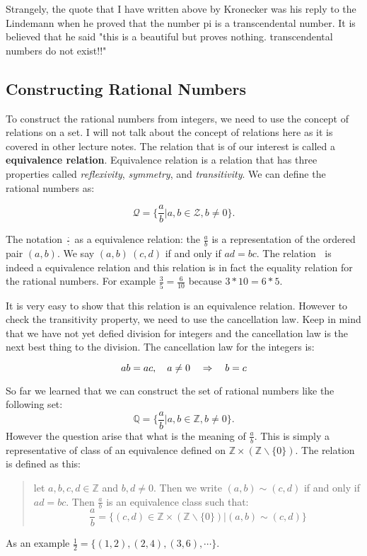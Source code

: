 Strangely, the quote that I have written above by Kronecker was his reply to the Lindemann when he proved that the number pi is a transcendental number. It is believed that he said "this is a beautiful but proves nothing. transcendental numbers do not exist!!"


\subsection{Constructing Rational Numbers}

To construct the rational numbers from integers, we need to use the concept of relations on a set. I will not talk about the concept of relations here as it is covered in other lecture notes. The relation that is of our interest is called a \textbf{equivalence relation}. Equivalence relation is a relation that has three properties called \textit{reflexivity}, \textit{symmetry}, and \textit{transitivity}. We can define the rational numbers as:

\[ \mathcal{Q} = \{ \frac{a}{b} | a,b \in \mathcal{Z}, b \neq 0 \}. \]

The notation $ \frac{\cdot}{\cdot} $ as a equivalence relation: the $ \frac{a}{b} $ is a representation of the ordered pair $ (a,b) $. We say $ (a,b) ~ (c,d) $ if and only if $ ad = bc $. The relation $ ~ $ is indeed a equivalence relation and this relation is in fact the equality relation for the rational numbers. For example $ \frac{3}{5} = \frac{6}{10} $ because $ 3*10 = 6*5 $.

It is very easy to show that this relation is an equivalence relation. However to check the transitivity property, we need to use the cancellation law. Keep in mind that we have not yet defied division for integers and the cancellation law is the next best thing to the division. The cancellation law for the integers is:

\[ ab = ac, \quad a \neq 0 \quad \Rightarrow \quad b=c \]



So far we learned that we can construct the set of rational numbers like the following set:
\[ \mathbb{Q} = \{ \frac{a}{b} | a,b \in \mathbb{Z}, b \neq 0 \}. \]
However the question arise that what is the meaning of $ \frac{a}{b} $. This is simply a representative of class of an equivalence defined on $ \mathbb{Z} \times (\mathbb{Z}\backslash\{0\})$. The relation is defined as this:
\begin{quote}
	let $ a,b,c,d \in \mathbb{Z} $ and $ b,d \neq 0 $. Then we write $ (a,b) \sim (c,d) $ if and only if $ ad = bc $. Then $ \frac{a}{b} $ is an equivalence class such that: \[ \frac{a}{b} = \{ (c,d) \in \mathbb{Z} \times (\mathbb{Z}\backslash\{0\}) | (a,b) \sim (c,d) \} \]
\end{quote}
As an example $ \frac{1}{2} = \{ (1,2), (2,4), (3,6), \cdots \} $.

